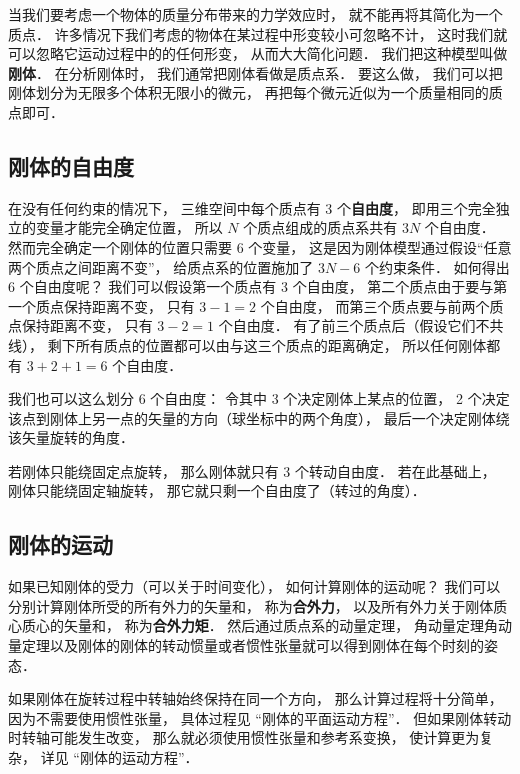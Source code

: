 

当我们要考虑一个物体的质量分布带来的力学效应时， 就不能再将其简化为一个质点． 许多情况下我们考虑的物体在某过程中形变较小可忽略不计， 这时我们就可以忽略它运动过程中的的任何形变， 从而大大简化问题． 我们把这种模型叫做\textbf{刚体}． 在分析刚体时， 我们通常把刚体看做是质点系． 要这么做， 我们可以把刚体划分为无限多个体积无限小的微元， 再把每个微元近似为一个质量相同的质点即可． 

\subsection{刚体的自由度}

在没有任何约束的情况下， 三维空间中每个质点有 3 个\textbf{自由度}， 即用三个完全独立的变量才能完全确定位置， 所以 $N$ 个质点组成的质点系共有 $3N$ 个自由度． 然而完全确定一个刚体的位置只需要 6 个变量， 这是因为刚体模型通过假设“任意两个质点之间距离不变”， 给质点系的位置施加了 $3N - 6$ 个约束条件． 如何得出 6 个自由度呢？ 我们可以假设第一个质点有 3 个自由度， 第二个质点由于要与第一个质点保持距离不变， 只有 $3 - 1 = 2$ 个自由度， 而第三个质点要与前两个质点保持距离不变， 只有 $3 - 2 = 1$ 个自由度． 有了前三个质点后（假设它们不共线）， 剩下所有质点的位置都可以由与这三个质点的距离确定， 所以任何刚体都有 $3 + 2 + 1 = 6$ 个自由度．

我们也可以这么划分 6 个自由度： 令其中 3 个决定刚体上某点的位置， 2 个决定该点到刚体上另一点的矢量的方向（球坐标中的两个角度）， 最后一个决定刚体绕该矢量旋转的角度．

若刚体只能绕固定点旋转， 那么刚体就只有 3 个转动自由度． 若在此基础上， 刚体只能绕固定轴旋转， 那它就只剩一个自由度了（转过的角度）．

\subsection{刚体的运动}
如果已知刚体的受力（可以关于时间变化）， 如何计算刚体的运动呢？ 我们可以分别计算刚体所受的所有外力的矢量和， 称为\textbf{合外力}， 以及所有外力关于刚体质心质心的矢量和， 称为\textbf{合外力矩}． 然后通过质点系的动量定理， 角动量定理角动量定理以及刚体的刚体的转动惯量或者惯性张量就可以得到刚体在每个时刻的姿态．

如果刚体在旋转过程中转轴始终保持在同一个方向， 那么计算过程将十分简单， 因为不需要使用惯性张量， 具体过程见 “刚体的平面运动方程”． 但如果刚体转动时转轴可能发生改变， 那么就必须使用惯性张量和参考系变换， 使计算更为复杂， 详见 “刚体的运动方程”．
